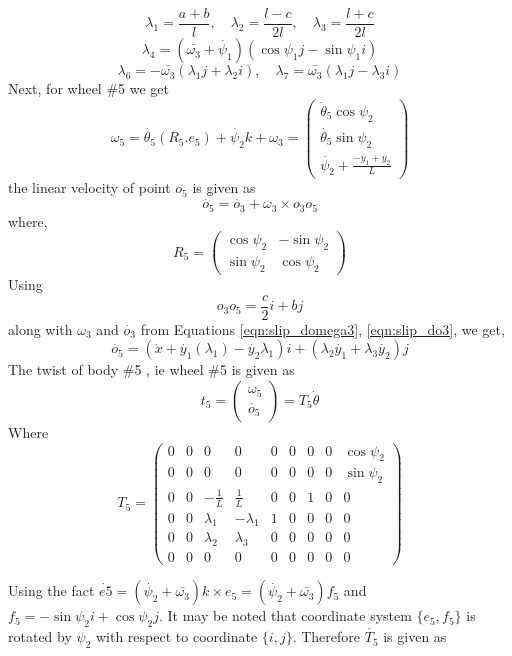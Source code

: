 { \[\lambda_1=\frac{a+b}{l}, \quad \lambda_2=\frac{l-c}{2l}, \quad \lambda_3=\frac{l+c}{2l} \]
  \[\lambda_4=(\bar{\omega_3}+\dot{\psi_1}) (\cos\psi_1 j-\sin \psi_1 i) \]
  \[\lambda_6=-\bar{\omega_3}(\lambda_1 j+\lambda_2 i), \quad \lambda_7=\bar{\omega_3}(\lambda_1 j-\lambda_3 i)\]
Next, for wheel \#5  we get 
\[\omega_5 = \dot{\theta_5} (R_5.e_5) + \dot{\psi_2} k + \omega_3 =
  \left(
\begin{array}{c}
\dot{\theta }_5 \cos \psi_2 \\
\dot{\theta_5} \sin \psi_2 \\
\dot{\psi_2}+\frac{-\dot{y_1}+\dot{y_2}}{L}
\end{array}
\right) \]
the linear velocity of point $o_5$ is given as 
\[ \dot{o_5}=\dot{o_3}+\omega_3 \times o_3o_5\]
where, \begin{equation}
\label{eqn:slipR5}
R_5=\begin{pmatrix}
\cos \psi_2 & - \sin \psi_2\\
\sin \psi_2 & \cos\psi_2
\end{pmatrix}
\end{equation}
Using  \[ o_3o_5=\frac{c}{2}i+bj\] along with $\omega_3$ and $\dot{o_3}$ from Equations \ref{eqn:slip_domega3}, \ref{eqn:slip_do3}, we get,
\[\dot{o_5}= \left( \dot{x}+\dot{y_1}(\lambda_1)-\dot{y_2}\lambda_1 \right)i +\left( \lambda_2\dot{y_1}+\lambda_3\dot{y_2}\right)j  \]
The twist of body \#5 , ie wheel \#5 is given as 
\begin{equation}
\label{eqn:slip_t5}
t_5=
\begin{pmatrix}
\omega_5\\
\dot{o_5}
\end{pmatrix}=T_5 \dot{\theta}
\end{equation}
Where
\begin{equation}
\label{eqn:slip_T5}
T_5=\left(
\begin{array}{ccccccccc}
0 & 0 & 0 & 0 & 0 & 0 & 0 & 0 & \cos \psi_2\\
0 & 0 & 0 & 0 & 0 & 0 & 0 & 0 & \sin\psi_2 \\
0 & 0 & -\frac{1}{L} & \frac{1}{L} & 0 & 0 & 1 & 0 & 0 \\
0 & 0 & \lambda_1 & -\lambda_1 & 1 & 0 & 0 & 0 & 0 \\
0 & 0 &\lambda_2& \lambda_3 & 0 & 0 & 0 & 0 & 0 \\
0 & 0 & 0 & 0 & 0 & 0 & 0 & 0 & 0
\end{array}
\right)
\end{equation}

Using the fact $\dot{e5}=(\dot{\psi_2}+\bar{\omega_3})k\times e_5 =(\dot{\psi_2}+\bar{\omega_3})f_5$ and $f_5=-\sin \psi_2 i+\cos \psi_2 j$. It may be noted that coordinate system $\{e_5,f_5\}$ is rotated by $\psi_2$ with respect to coordinate $ \{i,j\}$. Therefore $\dot{T_5}$ is given as

}
